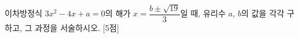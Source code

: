 이차방정식 $3x^2-4x+a=0$의 해가 $x=\dfrac{b\pm\sqrt{19}}{3}$일 때, 유리수 $a$, $b$의 값을 각각 구하고, 그 과정을 서술하시오. \mbox{[5점]}
